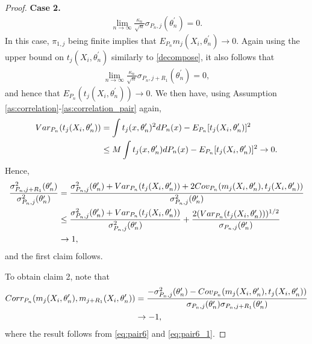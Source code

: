\documentclass[letterpaper,11pt]{article}
\theoremstyle{myplain}
\theoremstyle{mydefinition}
\theoremstyle{myremark}
\numberwithin{equation}{section}
\numberwithin{figure}{section}
\begin{document}
\begin{appendices}
\begin{proof}
\noindent \textbf{Case 2.}
\begin{align}
\lim_{n \to \infty}\frac{\kappa_n}{\sqrt n}\sigma_{P_n,j}(\theta^\prime_n) =0.\label{pair3}
\end{align}
In this case, $\pi_{1,j}$ being finite implies that $E_{P_n}m_j(X_i,\theta^\prime_n) \to 0.$ Again using the upper bound on $t_j(X_i,\theta^\prime_n)$ similarly to \eqref{decompose}, it also follows that 
\begin{align}
\lim_{n \to \infty}\frac{\kappa_n}{\sqrt n}\sigma_{P_n,j+R_1}(\theta^\prime_n) =0,
\end{align}
and hence that $E_{P_n}(t_j(X_i,\theta^\prime_n)) \to 0.$
We then have, using Assumption \ref{as:correlation}-\ref{as:correlation_pair} again,
\begin{align}
	Var_{P_n}(t_j(X_i,\theta^\prime_n))&=\int t_j(x,\theta^\prime_n)^2dP_n(x)-E_{P_n}[t_j(X_i,\theta^\prime_n)]^2 \notag\\
	&\le M\int t_j(x,\theta^\prime_n)dP_n(x) -E_{P_n}[t_j(X_i,\theta^\prime_n)]^2\to 0.\label{eq:pair6}
\end{align}
Hence,
\begin{align}
\frac{\sigma^2_{P_n,j+R_1}(\theta^\prime_n)}{\sigma^2_{P_n,j}(\theta^\prime_n)}&=\frac{\sigma^2_{P_n,j}(\theta^\prime_n) + Var_{P_n}(t_j(X_i,\theta^\prime_n))+2Cov_{P_n}(m_j(X_i,\theta^\prime_n),t_j(X_i,\theta^\prime_n))}{\sigma^2_{P_n,j}(\theta^\prime_n)} \notag\\
&\le \frac{\sigma^2_{P_n,j}(\theta^\prime_n) + Var_{P_n}(t_j(X_i,\theta^\prime_n))}{\sigma^2_{P_n,j}(\theta^\prime_n)}+\frac{2(Var_{P_n}(t_j(X_i,\theta^\prime_n)))^{1/2}}{\sigma_{P_n,j}(\theta^\prime_n)} \notag\\
&\to 1,\label{eq:pair6_1}
\end{align}
and the first claim follows.     

To obtain claim 2, note that 
\begin{align}
Corr_{P_n}(m_j(X_i,\theta^\prime_n),m_{j+R_1}(X_i,\theta^\prime_n))&=\frac{-\sigma^2_{P_n,j}(\theta^\prime_n)-Cov_{P_n}(m_{j}(X_i,\theta^\prime_n),t_j(X_i,\theta^\prime_n))}{\sigma_{P_n,j}(\theta^\prime_n)\sigma_{P_n,j+R_1}(\theta^\prime_n)}\notag \\
&\to -1,
\end{align}
where the result follows from \eqref{eq:pair6} and \eqref{eq:pair6_1}.


\end{proof}
\end{appendices}
\end{document}
